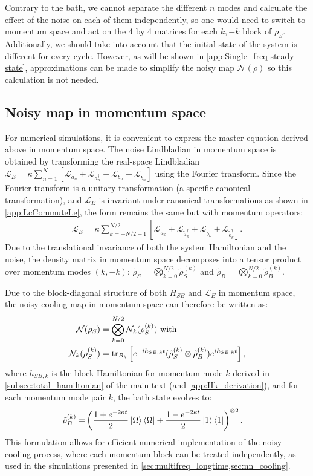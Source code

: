Contrary to the bath, we cannot separate the different $n$ modes and calculate the effect of the noise on each of them independently, so one would need to switch to momentum space and act on the 4 by 4 matrices for each $k,-k$ block of $\rho_S$. Additionally, we should take into account that the initial state of the system is different for every cycle. However, as will be shown in \cref{app:Single_freq steady state}, approximations can be made to simplify the noisy map $\mathcal{N}(\rho)$ so this calculation is not needed.


\subsection{Noisy map in momentum space}

For numerical simulations, it is convenient to express the master equation derived above in momentum space. The noise Lindbladian in momentum space is obtained by transforming the real-space Lindbladian $\mathcal{L}_E = \kappa\sum_{n=1}^N \left[\mathcal{L}_{a_n} + \mathcal{L}_{a_n^\dagger} + \mathcal{L}_{b_n} + \mathcal{L}_{b_n^\dagger}\right]$ using the Fourier transform. Since the Fourier transform is a unitary transformation (a specific canonical transformation), and $\mathcal{L}_E$ is invariant under canonical transformations as shown in \cref{app:LcCommuteLe}, the form remains the same but with momentum operators:
\begin{align}
    \mathcal{L}_E = \kappa\sum_{k=-N/2+1}^{N/2} \left[\mathcal{L}_{\tilde{a}_k} + \mathcal{L}_{\tilde{a}_k^\dagger} + \mathcal{L}_{\tilde{b}_k} + \mathcal{L}_{\tilde{b}_k^\dagger}\right].
\end{align}
Due to the translational invariance of both the system Hamiltonian and the noise, the density matrix in momentum space decomposes into a tensor product over momentum modes $(k,-k)$: $\tilde{\rho}_S = \bigotimes_{k=0}^{N/2} \tilde{\rho}_S^{(k)}$ and $\tilde{\rho}_B = \bigotimes_{k=0}^{N/2} \tilde{\rho}_B^{(k)}$.

Due to the block-diagonal structure of both $H_{SB}$ and $\mathcal{L}_E$ in momentum space, the noisy cooling map in momentum space can therefore be written as:
\begin{align}
    \mathcal{N}(\rho_S)         &= \bigotimes_{k=0}^{N/2} \mathcal{N}_k(\rho_S^{(k)}) \mbox{ with }\\
    \mathcal{N}_k(\rho_S^{(k)}) &= \operatorname{tr}_{B_k}\left[e^{-ih_{SB,k}t}(\tilde{\rho}_S^{(k)} \otimes \tilde{\rho}_B^{(k)})e^{i h_{SB,k}t}\right],
\end{align}
where $h_{SB,k}$ is the block Hamiltonian for momentum mode $k$ derived in \cref{subsec:total_hamiltonian} of the main text (and \cref{app:Hk_derivation}), and for each momentum mode pair $k$, the bath state evolves to:
\begin{align}
    \tilde{\rho}_B^{(k)} = &\left(\frac{1+e^{-2\kappa t}}{2}\ket{\Omega}\bra{\Omega}+\frac{1-e^{-2\kappa t}}{2}\ket{1}\bra{1} \right)^{\otimes 2}.
\end{align}
This formulation allows for efficient numerical implementation of the noisy cooling process, where each momentum block can be treated independently, as used in the simulations presented in \cref{sec:multifreq_longtime,sec:nn_cooling}.

